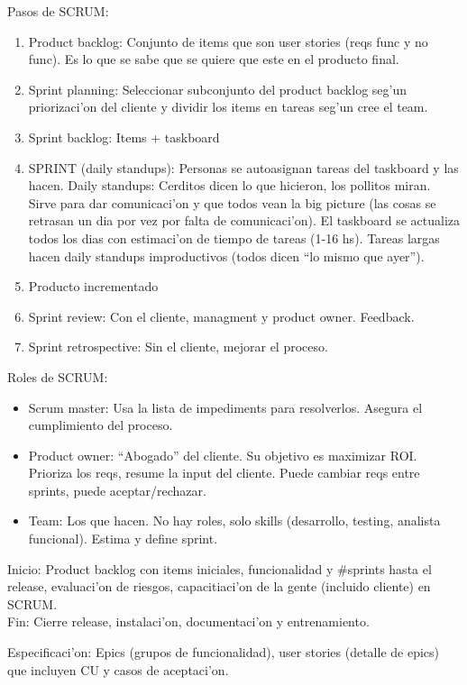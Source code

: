 \documentclass[a4paper,spanish]{article}
\newenvironment{items}{
		\vspace*{-\topsep}
		\begin{itemize} 
		\addtolength{\itemsep}{-0.5\baselineskip}
		}{\end{itemize}\vspace*{-\topsep}}
\newenvironment{numbers}{
		\vspace*{-\topsep}
		\begin{enumerate} 
		\addtolength{\itemsep}{-0.5\baselineskip}
		}{\end{enumerate}\vspace*{-\topsep}}
\begin{document}
Pasos de SCRUM: 
\begin{numbers}
\item Product backlog: Conjunto de items que son user stories 
	(reqs func y no func). Es lo que se sabe que se quiere que este en
	el producto final.
\item Sprint planning: Seleccionar subconjunto del product backlog seg'un
	priorizaci'on del cliente y dividir	los items en tareas seg'un cree
	el team.
\item Sprint backlog: Items + taskboard
\item SPRINT (daily standups): Personas se autoasignan tareas del taskboard y
	las hacen. Daily standups: Cerditos dicen lo que hicieron, los pollitos 
	miran. Sirve para dar comunicaci'on y que todos vean la big picture (las
	cosas se retrasan un dia por vez por falta de comunicaci'on). El taskboard
	se actualiza todos los dias con estimaci'on de tiempo de tareas (1-16 hs).
	Tareas largas hacen daily standups improductivos (todos dicen ``lo mismo
	que ayer'').
\item Producto incrementado 
\item Sprint review: Con el cliente, managment y product owner. Feedback.
\item Sprint retrospective: Sin el cliente, mejorar el proceso.
\end{numbers}

Roles de SCRUM:
\begin{items}
\item Scrum master: Usa la lista de impediments para resolverlos. Asegura el
	cumplimiento del proceso.
\item Product owner: ``Abogado'' del cliente. Su objetivo es maximizar ROI.
	Prioriza los reqs, resume la input del cliente. Puede cambiar reqs entre
	sprints, puede aceptar/rechazar.
\item Team: Los que hacen. No hay roles, solo skills (desarrollo, testing,
	analista funcional). Estima y define sprint.
\end{items}

Inicio: Product backlog con items iniciales, funcionalidad y \#sprints hasta
	el release, evaluaci'on de riesgos, capacitiaci'on de la gente (incluido
	cliente) en SCRUM. \\
Fin: Cierre release, instalaci'on, documentaci'on y entrenamiento.

Especificaci'on: Epics (grupos de funcionalidad), user stories (detalle de 
	epics) que incluyen CU y casos de aceptaci'on.
\end{document}
